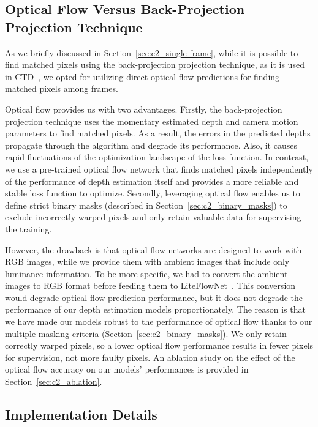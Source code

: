 \subsection{Optical Flow Versus Back-Projection Projection Technique} \label{sec:c2_liteflownet}
As we briefly discussed in Section~\ref{sec:c2_single-frame}, while it is possible to find matched pixels using the back-projection projection technique, as it is used in CTD~\citep{riegler2019connecting}, we opted for utilizing direct optical flow predictions for finding matched pixels among frames.

Optical flow provides us with two advantages. Firstly, the back-projection projection technique uses the momentary estimated depth and camera motion parameters to find matched pixels. As a result, the errors in the predicted depths propagate through the algorithm and degrade its performance. Also, it causes rapid fluctuations of the optimization landscape of the loss function. In contrast, we use a pre-trained optical flow network that finds matched pixels independently of the performance of depth estimation itself and provides a more reliable and stable loss function to optimize. Secondly, leveraging optical flow enables us to define strict binary masks (described in Section~\ref{sec:c2_binary_masks}) to exclude incorrectly warped pixels and only retain valuable data for supervising the training.

However, the drawback is that optical flow networks are designed to work with RGB images, while we provide them with ambient images that include only luminance information. To be more specific, we had to convert the ambient images to RGB format before feeding them to LiteFlowNet~\citep{hui2018liteflownet}. This conversion would degrade optical flow prediction performance, but it does not degrade the performance of our depth estimation models proportionately. The reason is that we have made our models robust to the performance of optical flow thanks to our multiple masking criteria (Section~\ref{sec:c2_binary_masks}). We only retain correctly warped pixels, so a lower optical flow performance results in fewer pixels for supervision, not more faulty pixels. An ablation study on the effect of the optical flow accuracy on our models' performances is provided in Section~\ref{sec:c2_ablation}.

\subsection{Implementation Details} \label{sec:c2_implementation}

